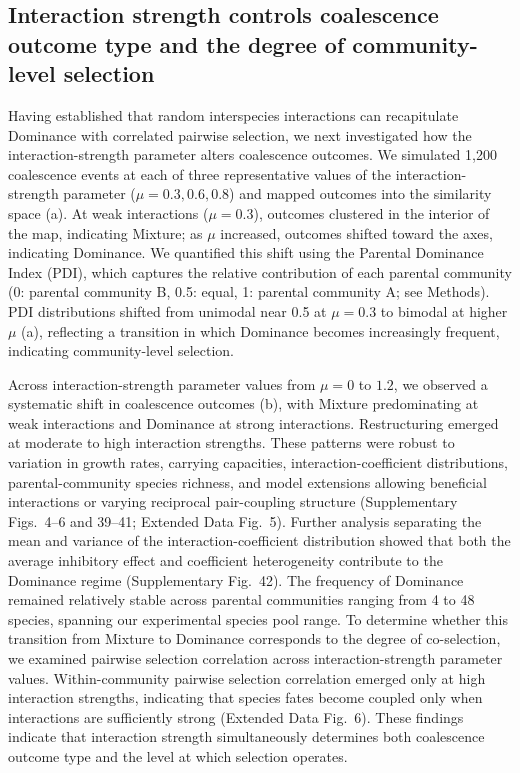 \subsection{Interaction strength controls coalescence outcome type and the degree of community-level selection}
\label{sec:results:interaction_strength}

Having established that random interspecies interactions can recapitulate Dominance with correlated pairwise selection, we next investigated how the interaction-strength parameter alters coalescence outcomes. We simulated 1,200 coalescence events at each of three representative values of the interaction-strength parameter ($\mu = 0.3, 0.6, 0.8$) and mapped outcomes into the similarity space (a). At weak interactions ($\mu = 0.3$), outcomes clustered in the interior of the map, indicating Mixture; as $\mu$ increased, outcomes shifted toward the axes, indicating Dominance. We quantified this shift using the Parental Dominance Index (PDI), which captures the relative contribution of each parental community (0: parental community B, 0.5: equal, 1: parental community A; see Methods). PDI distributions shifted from unimodal near 0.5 at $\mu = 0.3$ to bimodal at higher $\mu$ (a), reflecting a transition in which Dominance becomes increasingly frequent, indicating community-level selection.

Across interaction-strength parameter values from $\mu = 0$ to $1.2$, we observed a systematic shift in coalescence outcomes (b), with Mixture predominating at weak interactions and Dominance at strong interactions. Restructuring emerged at moderate to high interaction strengths. These patterns were robust to variation in growth rates, carrying capacities, interaction-coefficient distributions, parental-community species richness, and model extensions allowing beneficial interactions or varying reciprocal pair-coupling structure (Supplementary Figs.~4--6 and 39--41; Extended Data Fig.~5). Further analysis separating the mean and variance of the interaction-coefficient distribution showed that both the average inhibitory effect and coefficient heterogeneity contribute to the Dominance regime (Supplementary Fig.~42). The frequency of Dominance remained relatively stable across parental communities ranging from 4 to 48 species, spanning our experimental species pool range. To determine whether this transition from Mixture to Dominance corresponds to the degree of co-selection, we examined pairwise selection correlation across interaction-strength parameter values. Within-community pairwise selection correlation emerged only at high interaction strengths, indicating that species fates become coupled only when interactions are sufficiently strong (Extended Data Fig.~6). These findings indicate that interaction strength simultaneously determines both coalescence outcome type and the level at which selection operates.


